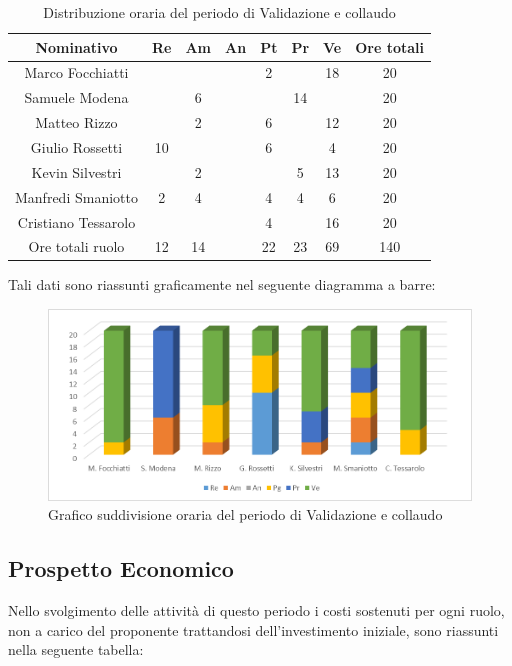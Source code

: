 \documentclass[./PianodiProgetto.tex]{subfiles}
\begin{document}
\begin{table}[H]
	\centering
	\begin{tabular}{|c|cccccc|c|}
		\hline
		Nominativo&Re&Am&An&Pt&Pr&Ve&Ore totali\\ \hline
		Marco Focchiatti& & & &2& &18&20 \\ \hline
		Samuele Modena& &6& & &14& &20 \\ \hline
		Matteo Rizzo& &2& &6& &12&20 \\ \hline
		Giulio Rossetti&10& & &6& &4&20 \\ \hline
		Kevin Silvestri& &2& & &5&13&20 \\ \hline
		Manfredi Smaniotto&2&4& &4&4&6&20 \\ \hline
		Cristiano Tessarolo& & & &4& &16&20 \\  \hline
		Ore totali ruolo&12&14& &22&23&69&140 \\ \hline
	\end{tabular}
	\caption{Distribuzione oraria del periodo di Validazione e collaudo}
\end{table}

Tali dati sono riassunti graficamente nel seguente diagramma a barre:
\begin{figure}[H]
	\centering
	\includegraphics[width=1\linewidth]{img/grafici/ValidazioneCollaudoProspettoOrario}
	\caption{Grafico suddivisione oraria del periodo di Validazione e collaudo}
	\label{fig:validazione-collaudo-prospetto-orario}
\end{figure}

\subsection{Prospetto Economico}
Nello svolgimento delle attività di questo periodo i costi sostenuti per ogni ruolo, non a carico del proponente trattandosi dell’investimento iniziale, sono riassunti nella seguente tabella:
\end{document}

